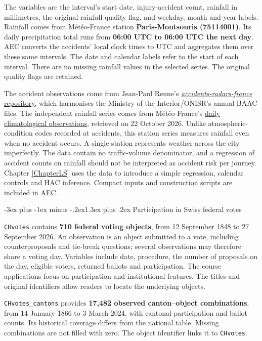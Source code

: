 \documentclass[
  11pt,
]{book}
\makeatletter
\renewcommand\section{\@startsection{section}{1}{\z@}
  {-3ex plus -1ex minus -.2ex}{1.3ex plus .2ex}
  {\normalfont\Large\bfseries\color{TextbookInk}}}
\theoremstyle{definition}
\theoremstyle{definition}
\theoremstyle{definition}
\theoremstyle{definition}
\theoremstyle{remark}
\makeatother
\begin{document}
The variables are the interval's start date, injury-accident count, rainfall in millimetres, the original rainfall quality flag, and weekday, month and year labels. Rainfall comes from Météo-France station \textbf{Paris-Montsouris (75114001)}. Its daily precipitation total runs from \textbf{06:00 UTC to 06:00 UTC the next day}. AEC converts the accidents' local clock times to UTC and aggregates them over these same intervals. The date and calendar labels refer to the start of each interval. There are no missing rainfall values in the selected series. The original quality flags are retained.

The accident observations come from Jean-Paul Renne's \href{https://github.com/jrenne/accidents-radars-france}{\emph{accidents-radars-france} repository}, which harmonises the Ministry of the Interior/ONISR's annual BAAC files. The independent rainfall series comes from Météo-France's \href{https://www.data.gouv.fr/datasets/donnees-climatologiques-de-base-quotidiennes}{daily climatological observations}, retrieved on 22 October 2026. Unlike atmospheric-condition codes recorded at accidents, this station series measures rainfall even when no accident occurs. A single station represents weather across the city imperfectly. The data contain no traffic-volume denominator, and a regression of accident counts on rainfall should not be interpreted as accident risk per journey. Chapter \ref{ChapterLS} uses the data to introduce a simple regression, calendar controls and HAC inference. Compact inputs and construction scripts are included in AEC.

\section{Participation in Swiss federal votes}\label{data-votes}

\texttt{CHvotes} contains \textbf{710 federal voting objects}, from 12 September 1848 to 27 September 2026. An observation is an object submitted to a vote, including counterproposals and tie-break questions; several observations may therefore share a voting day. Variables include date, procedure, the number of proposals on the day, eligible voters, returned ballots and participation. The course applications focus on participation and institutional features. The titles and original identifiers allow readers to locate the underlying objects.

\texttt{CHvotes\_cantons} provides \textbf{17,482 observed canton--object combinations}, from 14 January 1866 to 3 March 2024, with cantonal participation and ballot counts. Its historical coverage differs from the national table. Missing combinations are not filled with zero. The object identifier links it to \texttt{CHvotes}.
\end{document}
